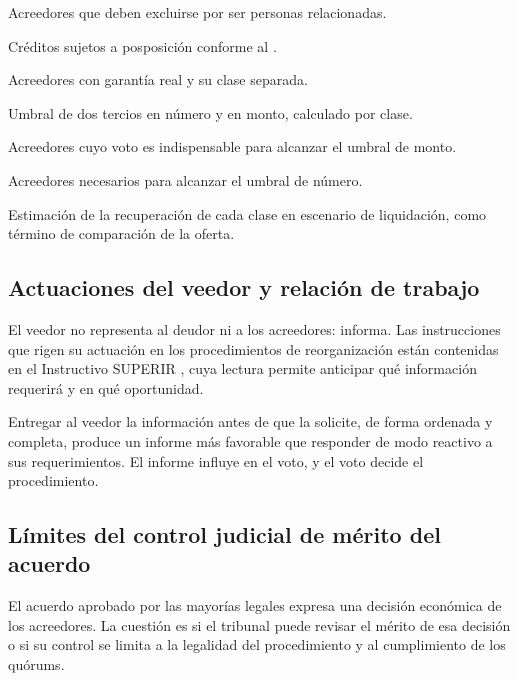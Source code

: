 \begin{checklist}
  \item Acreedores que deben excluirse por ser personas relacionadas.
  \item Créditos sujetos a posposición conforme al .
  \item Acreedores con garantía real y su clase separada.
  \item Umbral de dos tercios en número y en monto, calculado por clase.
  \item Acreedores cuyo voto es indispensable para alcanzar el umbral de monto.
  \item Acreedores necesarios para alcanzar el umbral de número.
  \item Estimación de la recuperación de cada clase en escenario de liquidación, como
  término de comparación de la oferta.
\end{checklist}

\subsection{Actuaciones del veedor y relación de trabajo}

El veedor no representa al deudor ni a los acreedores: informa. Las instrucciones que rigen
su actuación en los procedimientos de reorganización están contenidas en el Instructivo
SUPERIR  \parencite{instructivo-i3}, cuya lectura permite anticipar qué información
requerirá y en qué oportunidad.

\begin{practica}
Entregar al veedor la información antes de que la solicite, de forma ordenada y completa,
produce un informe más favorable que responder de modo reactivo a sus requerimientos. El
informe influye en el voto, y el voto decide el procedimiento.
\end{practica}

\bloqueJurisprudencial

\subsection{Límites del control judicial de mérito del acuerdo}

El acuerdo aprobado por las mayorías legales expresa una decisión económica de los
acreedores. La cuestión es si el tribunal puede revisar el mérito de esa decisión o si su
control se limita a la legalidad del procedimiento y al cumplimiento de los quórums.

